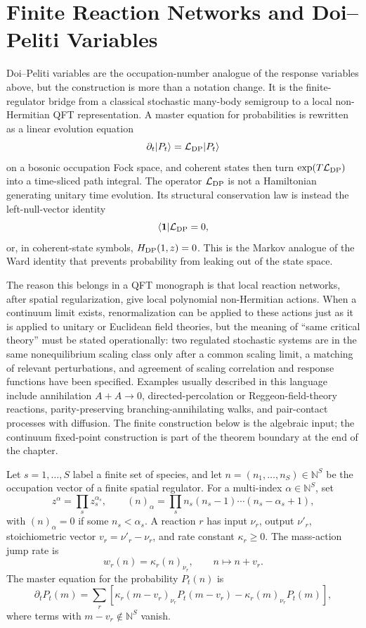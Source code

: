 \section{Finite Reaction Networks and Doi--Peliti Variables}
\label{sec:finite-reaction-network-doi-peliti}

Doi--Peliti variables are the occupation-number analogue of the response
variables above, but the construction is more than a notation change.  It is
the finite-regulator bridge from a classical stochastic many-body semigroup
to a local non-Hermitian QFT representation.  A master equation for
probabilities is rewritten as a linear evolution equation
\[
  \partial_t|P_t\rangle=\mathcal L_{\rm DP}|P_t\rangle
\]
on a bosonic occupation Fock space, and coherent states then turn
\(\exp(T\mathcal L_{\rm DP})\) into a time-sliced path integral.  The
operator \(\mathcal L_{\rm DP}\) is not a Hamiltonian generating unitary time
evolution.  Its structural conservation law is instead the left-null-vector
identity
\[
  \langle{\bf 1}|\mathcal L_{\rm DP}=0,
\]
or, in coherent-state symbols, \(H_{\rm DP}(1,z)=0\).  This is the Markov
analogue of the Ward identity that prevents probability from leaking out of
the state space.

The reason this belongs in a QFT monograph is that local reaction networks,
after spatial regularization, give local polynomial non-Hermitian actions.
When a continuum limit exists, renormalization can be applied to these
actions just as it is applied to unitary or Euclidean field theories, but the
meaning of ``same critical theory'' must be stated operationally: two
regulated stochastic systems are in the same nonequilibrium scaling class
only after a common scaling limit, a matching of relevant perturbations, and
agreement of scaling correlation and response functions have been specified.
Examples usually described in this language include annihilation
\(A+A\to0\), directed-percolation or Reggeon-field-theory reactions,
parity-preserving branching-annihilating walks, and pair-contact processes
with diffusion.  The finite construction below is the algebraic input; the
continuum fixed-point construction is part of the theorem boundary at the end
of the chapter.

Let \(s=1,\ldots,S\) label a finite set of species, and let
\(n=(n_1,\ldots,n_S)\in\mathbb N^S\) be the occupation vector of a finite
spatial regulator.  For a multi-index \(\alpha\in\mathbb N^S\), set
\[
  z^\alpha=\prod_s z_s^{\alpha_s},
  \qquad
  (n)_\alpha=\prod_s n_s(n_s-1)\cdots(n_s-\alpha_s+1),
\]
with \((n)_\alpha=0\) if some \(n_s<\alpha_s\).  A reaction \(r\) has input
\(\nu_r\), output \(\nu'_r\), stoichiometric vector
\(v_r=\nu'_r-\nu_r\), and rate constant \(\kappa_r\ge0\).  The mass-action
jump rate is
\[
  w_r(n)=\kappa_r(n)_{\nu_r},
  \qquad
  n\longmapsto n+v_r .
\]
The master equation for the probability \(P_t(n)\) is
\begin{equation}
  \partial_tP_t(m)
  =
  \sum_r
  \left[
    \kappa_r(m-v_r)_{\nu_r}P_t(m-v_r)
    -
    \kappa_r(m)_{\nu_r}P_t(m)
  \right],
  \label{eq:reaction-network-master-equation}
\end{equation}
where terms with \(m-v_r\notin\mathbb N^S\) vanish.


